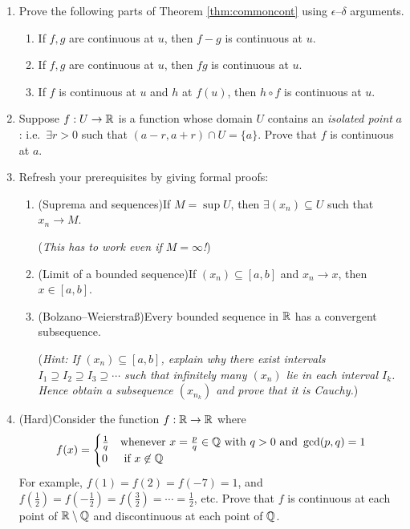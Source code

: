 \begin{exercises}
\begin{enumerate}
	
		\item Prove the following parts of Theorem \ref{thm:commoncont} using $\epsilon$--$\delta$ arguments.
		\begin{enumerate}
	  	\item If $f,g$ are continuous at $u$, then $f-g$ is continuous at $u$.
	  	\item If $f,g$ are continuous at $u$, then $fg$ is continuous at $u$.
	  	\item If $f$ is continuous at $u$ and $h$ at $f(u)$, then $h\circ f$ is continuous at $u$.
		\end{enumerate}
	  
	  
	  \item\label{exs:isolatedcont} Suppose $f:U\to \mathbb{R}$ is a function whose domain $U$ contains an \emph{isolated point} $a$: i.e.\ $\exists r>0$ such that $(a-r,a+r)\cap U=\{a\}$. Prove that $f$ is continuous at $a$.
	  
	  
	  \item\label{exs:extremevaluelemma} Refresh your prerequisites by giving formal proofs:
	  \begin{enumerate}
	    \item (Suprema and sequences)\lstsp If $M=\sup U$, then $\exists (x_n)\subseteq U$ such that $x_n\to M$.\par
	    (\emph{This has to work even if $M=\infty$!})
	    \item (Limit of a bounded sequence)\lstsp If $(x_n)\subseteq[a,b]$ and $x_n\to x$, then $x\in [a,b]$.
			\item (Bolzano--Weierstraß)\lstsp Every bounded sequence in $\mathbb{R}$ has a convergent subsequence.\par
			(\emph{Hint: If $(x_n)\subseteq [a,b]$, explain why there exist intervals $I_1\supseteq I_2\supseteq I_3\supseteq\cdots$ such that \emph{infinitely many} $(x_n)$ lie in each interval $I_k$. Hence obtain a subsequence $(x_{n_k})$ and prove that it is \emph{Cauchy.}\footnotemark})
		\end{enumerate}
		
		
		\item (Hard)\lstsp Consider the function $f:\mathbb{R}\to\mathbb{R}$ where
		\[
			f(x)=
			\begin{cases}
				\frac 1q&\text{whenever }x=\frac pq\in\mathbb{Q}\text{ with }q>0\text{ and }\gcd(p,q)=1\\
				0&\text{ if }x\not\in\mathbb{Q}
			\end{cases}
		\]
	  For example, $f(1)=f(2)=f(-7)=1$, and $f(\tfrac 12)=f(-\tfrac 12)=f(\tfrac 32)=\cdots=\frac 12$, etc. Prove that $f$ is continuous at each point of $\mathbb{R}\setminus\mathbb{Q}$ and discontinuous at each point of $\mathbb{Q}$.
	\end{enumerate}
\end{exercises}

